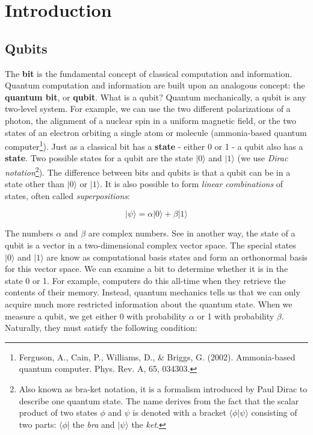 \chapter{Introduction}



\section{Qubits}
The \textbf{bit} is the fundamental concept of classical computation and information. Quantum computation and information are built upon an analogous concept: the \textbf{quantum bit}, or \textbf{qubit}. What is a qubit? Quantum mechanically, a qubit is any two-level system. For example, we can use the two different polarizations of a photon, the alignment of a nuclear spin in a
uniform magnetic field, or the two states of an electron orbiting a single atom or molecule (ammonia-based quantum computer\footnote{Ferguson, A., Cain, P., Williams, D., \& Briggs, G. (2002). Ammonia-based quantum computer. Phys. Rev. A, 65, 034303.}). Just as a classical bit has a \textbf{state} - either 0 or 1 - a qubit also has a \textbf{state}. Two possible states for a qubit are the state $|0\rangle$ and $|1\rangle$ (we use \textit{Dirac notation}\footnote{Also known as bra-ket notation, it is a formalism introduced by Paul Dirac to describe one quantum state. The name derives from the fact that the scalar product of two states $\phi$ and $\psi$ is denoted with a bracket $\langle\phi|\psi\rangle$ consisting of two parts: $\langle\phi|$ the \textit{bra} and $|\psi\rangle$ the \textit{ket}.}). The difference between bits and qubits is that a qubit can be in a state other than $|0\rangle$  or $|1\rangle$. It is also possible to form \textit{linear combinations} of states, often called \textit{superpositions}:

\begin{equation*}
    |\psi\rangle=\alpha|0\rangle + \beta|1\rangle
\end{equation*}

The numbers $\alpha$ and $\beta$ are complex numbers. See in another way, the state of a qubit is a vector in a two-dimensional complex vector space. The special states $|0\rangle$ and $|1\rangle$ are know as computational basis states and form an orthonormal basis for this vector space. We can examine a bit to determine whether it is in the state 0 or 1. For example, computers do this all-time when they retrieve the contents of their memory. Instead, quantum mechanics tells us that we can only acquire much more restricted information about the quantum state. When we measure a qubit, we get either 0 with probability $\alpha$ or 1 with probability $\beta$. Naturally, they must satisfy the following condition:


